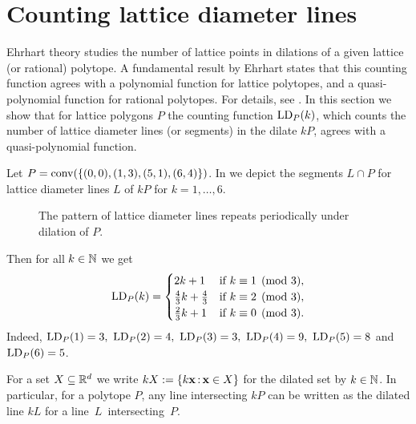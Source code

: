 \section{Counting lattice diameter lines}\label{sec:QP}

Ehrhart theory studies the number of lattice points in dilations of a given lattice (or rational) polytope. A fundamental result by Ehrhart states that this counting function agrees with a polynomial function for lattice polytopes, and a quasi-polynomial function for rational polytopes. For details, see \cite{beckrobins}. In this section we show that for lattice polygons $P$ the counting function $\operatorname{LD}_P(k)$, which counts the number of lattice diameter lines (or segments) in the dilate $kP$, agrees with a quasi-polynomial function.

\begin{example}\label{ex:qp}
    Let $P= \operatorname{conv}(\{(0,0), (1,3), (5,1), (6,4)\})$. In  we depict the segments $L \cap P$ for lattice diameter lines $L$ of $kP$ for $k=1, \ldots, 6$.
    
\begin{figure}[ht!]
    \centering
    
    \caption{The pattern of lattice diameter lines repeats periodically under dilation of $P$.}
    \label{fig:dilations}
\end{figure}

    Then for all $k \in \mathbb{N}$ we get\vspace{-1em}
    \begin{align*}
        \operatorname{LD}_P(k)=\begin{cases}
            2k+1 & \text{if } k \equiv 1 \pmod 3,\\
            \frac{4}{3} k + \frac{4}{3} & \text{if } k \equiv 2 \pmod 3,\\
            \frac{2}{3} k + 1 & \text{if } k \equiv 0 \pmod 3.
        \end{cases}
    \end{align*}
    Indeed, $\LD_P(1)=3,\ \LD_P(2)=4,\ \LD_P(3)=3,\ \LD_P(4)=9,\ \LD_P(5)=8$ and $\operatorname{LD}_P(6)=5$.
\end{example}

For a set $X \subseteq \mathbb{R}^d$ we write $kX:= \{k \mathbf{x} \, \mathrm{:}\, \mathbf{x} \in X\}$ for the dilated set by $k \in \mathbb{N}$. In particular, for a polytope $P$, any line intersecting $kP$ can be written as the dilated line $kL$ for a \mbox{line $L$ intersecting $P$.}

